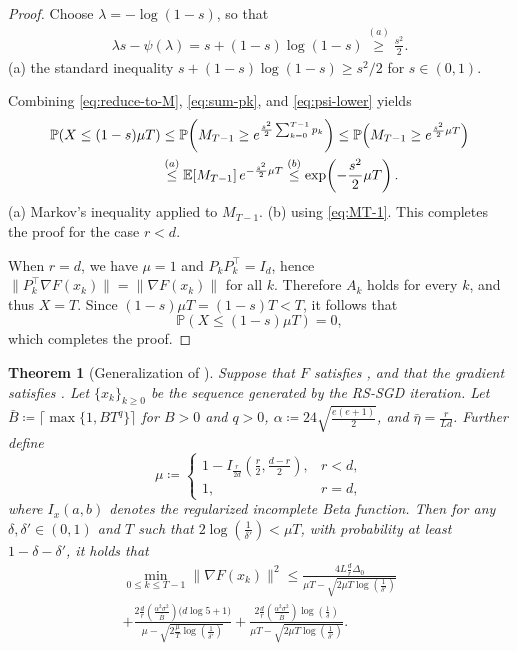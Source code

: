 \documentclass[10pt]{article}
\newtheorem{theorem}{Theorem}[section]
\begin{document}
\begin{proof}
Choose $\lambda=-\log(1-s)$, so that
\begin{align}
\lambda s-\psi(\lambda)
= s+(1-s)\log(1-s)
\overset{(a)}{\ge} \frac{s^2}{2}.
\label{eq:psi-lower}
\end{align}
(a)\; the standard inequality $s+(1-s)\log(1-s)\ge s^2/2$ for $s\in(0,1)$.

Combining \eqref{eq:reduce-to-M}, \eqref{eq:sum-pk}, and \eqref{eq:psi-lower} yields
\begin{align}
\mathbb{P}(X\le (1-s)\mu T)
&\le \mathbb{P}\!\left(M_{T-1}\ge e^{\frac{s^2}{2}\sum_{k=0}^{T-1}p_k}\right)
\le \mathbb{P}\!\left(M_{T-1}\ge e^{\frac{s^2}{2}\mu T}\right) \notag\\
&\overset{(a)}{\le} \mathbb{E}[M_{T-1}]\, e^{-\frac{s^2}{2}\mu T}
\overset{(b)}{\le} \exp\!\left(-\frac{s^2}{2}\mu T\right).
\label{eq:final-cher}
\end{align}
(a)\; Markov's inequality applied to $M_{T-1}$.
(b)\; using \eqref{eq:MT-1}.
This completes the proof for the case $r<d$.

When $r=d$, we have $\mu=1$ and $P_kP_k^\top=I_d$, hence
$\|P_k^\top \nabla F(x_k)\|=\|\nabla F(x_k)\|$ for all $k$.
Therefore $A_k$ holds for every $k$, and thus $X=T$.
Since $(1-s)\mu T=(1-s)T<T$, it follows that
\[
\mathbb{P}\!\left(X\le (1-s)\mu T\right)=0,
\]
which completes the proof.

\end{proof}



\begin{theorem}[Generalization of ]\label{app:thm:main_highprob}
Suppose that $F$ satisfies , and that the gradient 
satisfies .
Let $\{x_k\}_{k\ge 0}$ be the sequence generated by the RS-SGD iteration.
Let $\bar{B}\coloneqq \lceil \max\{1, BT^q\} \rceil$ for $B>0$ and $q>0$,
$\alpha \coloneqq 24\sqrt{\frac{e(e+1)}{2}}$,
and $\bar{\eta} = \frac{r}{Ld}$.
Further define
\begin{equation}
\mu \coloneqq
\begin{cases}
1 - I_{\frac{r}{2d}}\!\left(\frac{r}{2}, \frac{d-r}{2}\right), & r<d,\\
1, & r=d,
\end{cases}
\label{app:eq:def_mu}
\end{equation}
where $I_{x}(a,b)$ denotes the regularized incomplete Beta function.
Then for any $\delta, \delta' \in (0,1)$ and $T$ such that
$2\log\!\left(\frac{1}{\delta'}\right) < \mu T$, 
with probability at least $1-\delta-\delta'$, it holds that
\begin{align*}
\min_{0\leq k \leq T-1}\|\nabla F(x_k)\|^2 
\leq 
\frac{
4L\frac{d}{r}\Delta_0
}{
\mu T - \sqrt{2\mu T \log\!\left(\frac{1}{\delta'}\right)}
}
\\
+
\frac{
2\frac{d}{r}\left(\frac{\alpha^2\sigma^2}{\bar{B}}\right)
\bigl(d\log 5 + 1\bigr)
}{
\mu - \sqrt{2\frac{\mu}{T}\log\!\left(\frac{1}{\delta'}\right)}
}
+
\frac{
2\frac{d}{r}\left(\frac{\alpha^2\sigma^2}{\bar{B}}\right)
\log\!\left(\frac{1}{\delta}\right)
}{
\mu T - \sqrt{2\mu T \log\!\left(\frac{1}{\delta'}\right)}
}.
\end{align*}
\end{theorem}
\end{document}
